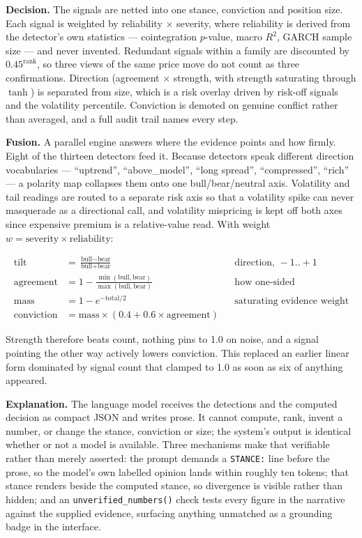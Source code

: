 \documentclass[11pt,a4paper]{article}
\begin{document}
\textbf{Decision.} The signals are netted into one stance, conviction and position size.
Each signal is weighted by reliability $\times$ severity, where reliability is derived from
the detector's own statistics --- cointegration $p$-value, macro $R^2$, GARCH sample size
--- and never invented. Redundant signals within a family are discounted by
$0.45^{\text{rank}}$, so three views of the same price move do not count as three
confirmations. Direction (agreement $\times$ strength, with strength saturating through
$\tanh$) is separated from size, which is a risk overlay driven by risk-off signals and the
volatility percentile. Conviction is demoted on genuine conflict rather than averaged, and
a full audit trail names every step.

\textbf{Fusion.} A parallel engine answers where the evidence points and how firmly. Eight
of the thirteen detectors feed it. Because detectors speak different direction
vocabularies --- ``uptrend'', ``above\_model'', ``long spread'', ``compressed'', ``rich''
--- a polarity map collapses them onto one bull/bear/neutral axis. Volatility and tail
readings are routed to a separate risk axis so that a volatility spike can never masquerade
as a directional call, and volatility mispricing is kept off both axes since expensive
premium is a relative-value read. With weight $w = \text{severity} \times
\text{reliability}$:

\begin{align*}
\text{tilt}       &= \frac{\text{bull} - \text{bear}}{\text{bull} + \text{bear}} & &\text{direction, } -1..+1\\
\text{agreement}  &= 1 - \frac{\min(\text{bull},\text{bear})}{\max(\text{bull},\text{bear})} & &\text{how one-sided}\\
\text{mass}       &= 1 - e^{-\text{total}/2} & &\text{saturating evidence weight}\\
\text{conviction} &= \text{mass} \times (0.4 + 0.6 \times \text{agreement}) &&
\end{align*}

Strength therefore beats count, nothing pins to 1.0 on noise, and a signal pointing the
other way actively lowers conviction. This replaced an earlier linear form dominated by
signal count that clamped to 1.0 as soon as six of anything appeared.

\textbf{Explanation.} The language model receives the detections and the computed decision
as compact JSON and writes prose. It cannot compute, rank, invent a number, or change the
stance, conviction or size; the system's output is identical whether or not a model is
available. Three mechanisms make that verifiable rather than merely asserted: the prompt
demands a \texttt{STANCE:} line before the prose, so the model's own labelled opinion lands
within roughly ten tokens; that stance renders beside the computed stance, so divergence is
visible rather than hidden; and an \texttt{unverified\_numbers()} check tests every figure
in the narrative against the supplied evidence, surfacing anything unmatched as a grounding
badge in the interface.
\end{document}
